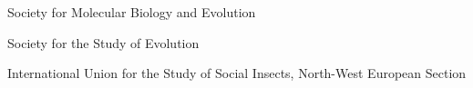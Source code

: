 {\color{awesome}\faAddressCard}


\begin{cvskills}

  \cvskill
    {} %
    {Society for Molecular Biology and Evolution} %

  \cvskill
    {} %
    {Society for the Study of Evolution} %

  \cvskill
    {} %
    {International Union for the Study of Social Insects, 
    North-West European Section} %


\end{cvskills}
